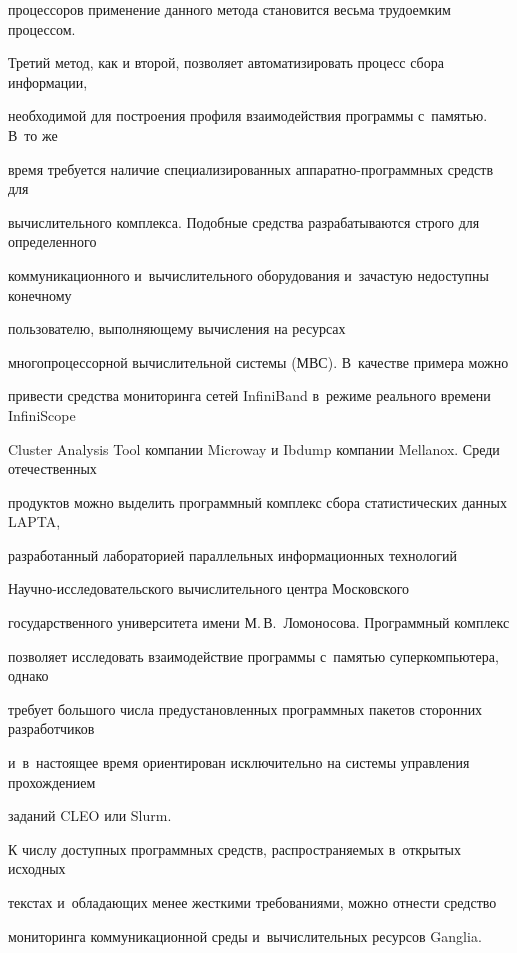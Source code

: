 процессоров применение данного метода становится весьма трудоемким процессом.





      Третий метод, как и второй, позволяет автоматизировать процесс сбора информации,


необходимой для построения профиля взаимодействия программы с~памятью. В~то же


время требуется наличие специализированных ап\-па\-рат\-но-про\-грам\-мных средств для


вычислительного комплекса. Подобные средства разрабатываются строго для определенного


коммуникационного и~вы\-чис\-ли\-тель\-но\-го оборудования и~зачастую недоступны конечному


пользователю, выполняющему вычисления на ресурсах


многопроцессорной вычислительной сис\-те\-мы (МВС). В~качестве примера можно


привести средства мониторинга сетей InfiniBand в~режиме реального времени InfiniScope


Cluster Analysis Tool компании Microway и Ibdump компании Mellanox. Среди отечественных


продуктов можно выделить программный комплекс сбора статистических данных LAPTA,


разработанный лабораторией параллельных информационных технологий


      На\-уч\-но-ис\-сле\-до\-ва\-тель\-ско\-го вычислительного центра Московского


государственного университета имени М.\,В.~Ломоносова. Программный комплекс


позволяет исследовать взаимодействие программы с~памятью суперкомпьютера, однако


требует большого чис\-ла предустановленных программных пакетов сторонних разработчиков


и~в~настоящее время ориентирован исключительно на сис\-те\-мы управ\-ле\-ния прохождением


заданий CLEO или Slurm.





      К числу доступных программных средств, распространяемых в~открытых исходных


текстах и~обладающих менее жесткими требованиями, можно от\-нес\-ти средство


мониторинга коммуникационной среды и~вычислительных ресурсов \mbox{Ganglia}.


